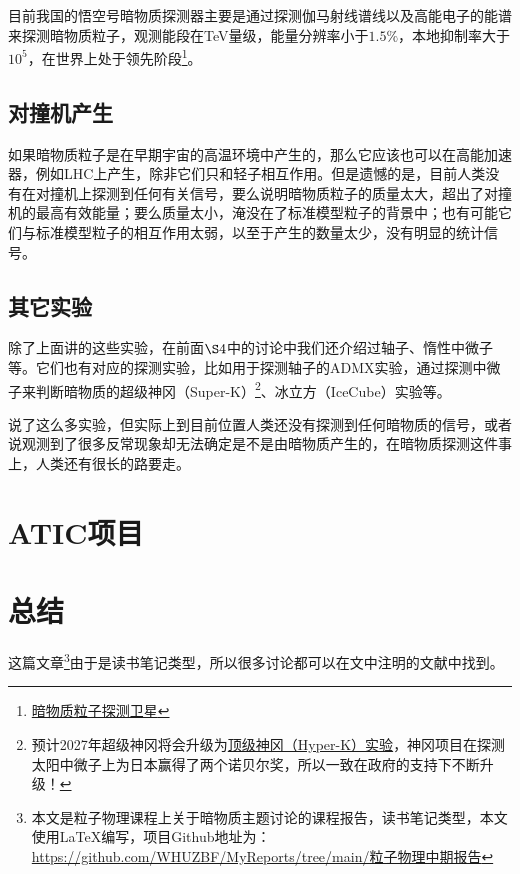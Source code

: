 \documentclass{ctexart}
\begin{document}
	目前我国的悟空号暗物质探测器主要是通过探测伽马射线谱线以及高能电子的能谱来探测暗物质粒子，观测能段在TeV量级，能量分辨率小于$1.5\%$，本地抑制率大于$10^5$，在世界上处于领先阶段\footnote{\href{http://pmo.cas.cn/dampe/}{暗物质粒子探测卫星}}。
	
	\subsection{对撞机产生}
	如果暗物质粒子是在早期宇宙的高温环境中产生的，那么它应该也可以在高能加速器，例如LHC上产生，除非它们只和轻子相互作用。但是遗憾的是，目前人类没有在对撞机上探测到任何有关信号，要么说明暗物质粒子的质量太大，超出了对撞机的最高有效能量；要么质量太小，淹没在了标准模型粒子的背景中；也有可能它们与标准模型粒子的相互作用太弱，以至于产生的数量太少，没有明显的统计信号。
	
	\subsection{其它实验}
	除了上面讲的这些实验，在前面$\S 4$中的讨论中我们还介绍过轴子、惰性中微子等。它们也有对应的探测实验，比如用于探测轴子的ADMX实验，通过探测中微子来判断暗物质的超级神冈（Super-K）\footnote{预计2027年超级神冈将会升级为\href{https://www-sk.icrr.u-tokyo.ac.jp/en/hk/}{顶级神冈（Hyper-K）实验}，神冈项目在探测太阳中微子上为日本赢得了两个诺贝尔奖，所以一致在政府的支持下不断升级！}\cite{Super-K}、冰立方（IceCube）\cite{IceCube}实验等。
	
	\hspace*{\fill}
	\noindent\makebox[\linewidth]{\rule{.5\paperwidth}{0.4pt}}
	\hspace*{\fill}
	
	说了这么多实验，但实际上到目前位置人类还没有探测到任何暗物质的信号，或者说观测到了很多反常现象却无法确定是不是由暗物质产生的，在暗物质探测这件事上，人类还有很长的路要走。
	
	\section{ATIC项目}
	
	
	
	\section{总结}
	这篇文章\footnote{本文是粒子物理课程上关于暗物质主题讨论的课程报告，读书笔记类型，本文使用\LaTeX 编写，项目Github地址为：\url{https://github.com/WHUZBF/MyReports/tree/main/粒子物理中期报告}}由于是读书笔记类型，所以很多讨论都可以在文中注明的文献中找到。
	
\end{document}

